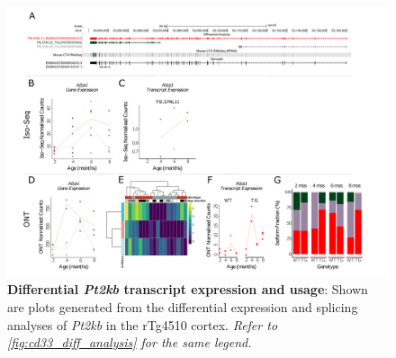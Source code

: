 \begin{landscape}
	\begin{figure}[htp]
		\begin{center}
			\includegraphics[page=13,trim={0 0.5cm 0 1.5cm},scale =0.85]{Figures/TargetGene_DifferentialAnalysis.pdf}
		\end{center}
		\captionsetup{width=1.5\textwidth}
		\caption[Differential \textit{Pt2kb} transcript expression and usage]%
		{\textbf{Differential \textit{Pt2kb} transcript expression and usage}: Shown are plots generated from the differential expression and splicing analyses of \textit{Pt2kb} in the rTg4510 cortex. \textit{Refer to \cref{fig:cd33_diff_analysis} for the same legend.}}   
		\label{fig:Ptk2b_diff_analysis}
	\end{figure}
\end{landscape}

